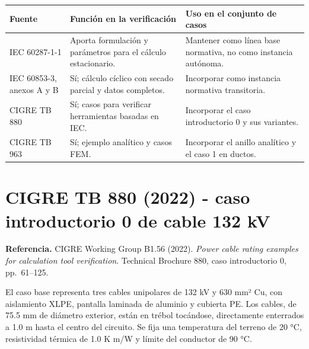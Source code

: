 \documentclass[11pt,a4paper,oneside]{report}
\newcounter{none}
\begin{document}
{\def\LTcaptype{none} %
\begin{longtable}[]{@{}
  >{\raggedright\arraybackslash}p{}
  >{\raggedright\arraybackslash}p{}
  >{\raggedright\arraybackslash}p{}@{}}
\toprule\noalign{}
\begin{minipage}[b]{\linewidth}\raggedright
Fuente
\end{minipage} & \begin{minipage}[b]{\linewidth}\raggedright
Función en la verificación
\end{minipage} & \begin{minipage}[b]{\linewidth}\raggedright
Uso en el conjunto de casos
\end{minipage} \\
\midrule\noalign{}
\endhead
\bottomrule\noalign{}
\endlastfoot
IEC 60287-1-1 & Aporta formulación y parámetros para el cálculo
estacionario. & Mantener como línea base normativa, no como instancia
autónoma. \\
IEC 60853-3, anexos A y B & Sí; cálculo cíclico con secado parcial y
datos completos. & Incorporar como instancia normativa transitoria. \\
CIGRE TB 880 & Sí; casos para verificar herramientas basadas en IEC. &
Incorporar el caso introductorio 0 y sus variantes. \\
CIGRE TB 963 & Sí; ejemplo analítico y casos FEM. & Incorporar el anillo
analítico y el caso 1 en ductos. \\
\end{longtable}
}

\section{CIGRE TB 880 (2022) - caso introductorio 0 de cable 132
kV}\label{cigre-tb-880-2022---caso-introductorio-0-de-cable-132-kv}

\textbf{Referencia.} CIGRE Working Group B1.56 (2022). \emph{Power cable
rating examples for calculation tool verification}. Technical Brochure
880, caso introductorio 0, pp.~61--125.

El caso base representa tres cables unipolares de 132 kV y 630 mm² Cu,
con aislamiento XLPE, pantalla laminada de aluminio y cubierta PE. Los
cables, de 75.5 mm de diámetro exterior, están en trébol tocándose,
directamente enterrados a 1.0 m hasta el centro del circuito. Se fija
una temperatura del terreno de 20 °C, resistividad térmica de 1.0 K m/W
y límite del conductor de 90 °C.
\end{document}
